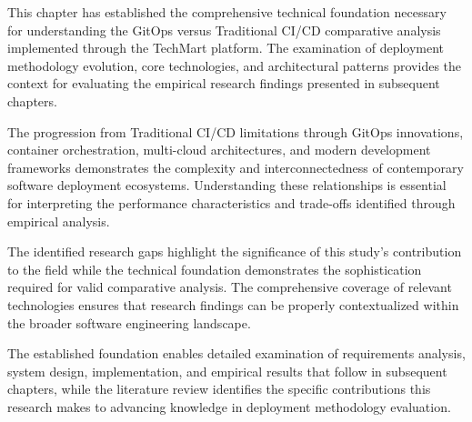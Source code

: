 This chapter has established the comprehensive technical foundation necessary for understanding the GitOps versus Traditional CI/CD comparative analysis implemented through the TechMart platform. The examination of deployment methodology evolution, core technologies, and architectural patterns provides the context for evaluating the empirical research findings presented in subsequent chapters.

The progression from Traditional CI/CD limitations through GitOps innovations, container orchestration, multi-cloud architectures, and modern development frameworks demonstrates the complexity and interconnectedness of contemporary software deployment ecosystems. Understanding these relationships is essential for interpreting the performance characteristics and trade-offs identified through empirical analysis.

The identified research gaps highlight the significance of this study's contribution to the field while the technical foundation demonstrates the sophistication required for valid comparative analysis. The comprehensive coverage of relevant technologies ensures that research findings can be properly contextualized within the broader software engineering landscape.

The established foundation enables detailed examination of requirements analysis, system design, implementation, and empirical results that follow in subsequent chapters, while the literature review identifies the specific contributions this research makes to advancing knowledge in deployment methodology evaluation.